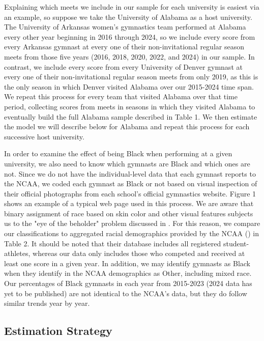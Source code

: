 \documentclass[12pt]{article}
\begin{document}
Explaining which meets we include in our sample for each university is easiest via an example, so suppose we take the University of Alabama as a host university. The University of Arkansas women’s gymnastics team performed at Alabama every other year beginning in 2016 through 2024, so we include every score from every Arkansas gymnast at every one of their non-invitational regular season meets from those five years (2016, 2018, 2020, 2022, and 2024) in our sample. In contrast, we include every score from every University of Denver gymnast at every one of their non-invitational regular season meets from only 2019, as this is the only season in which Denver visited Alabama over our 2015-2024 time span. We repeat this process for every team that visited Alabama over that time period, collecting scores from meets in seasons in which they visited Alabama to eventually build the full Alabama sample described in Table 1. We then estimate the model we will describe below for Alabama and repeat this process for each successive host university.

In order to examine the effect of being Black when performing at a given university, we also need to know which gymnasts are Black and which ones are not. Since we do not have the individual-level data that each gymnast reports to the NCAA, we coded each gymnast as Black or not based on visual inspection of their official photographs from each school’s official gymnastics website. Figure 1 shows an example of a typical web page used in this process. We are aware that binary assignment of race based on skin color and other visual features subjects us to the "eye of the beholder" problem discussed in \cite{fort_gill_2020}. For this reason, we compare our classifications to aggregated racial demographics provided by the NCAA (\citealp{ncaa_2018}) in Table 2. It should be noted that their database includes all registered student-athletes, whereas our data only includes those who competed and received at least one score in a given year. In addition, we may identify gymnasts as Black when they identify in the NCAA demographics as Other, including mixed race. Our percentages of Black gymnasts in each year from 2015-2023 (2024 data has yet to be published) are not identical to the NCAA's data, but they do follow similar trends year by year.

\subsection{Estimation Strategy}
\end{document}
